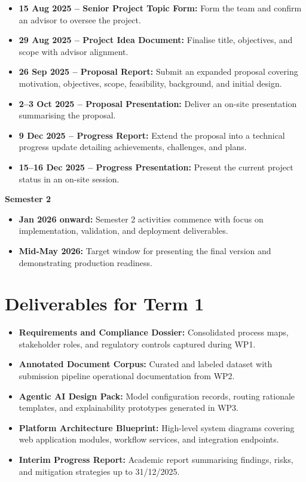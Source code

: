 \documentclass[12pt,oneside,openright,a4paper]{cpe-english-project}
\begin{document}
\begin{itemize}
\item \textbf{15 Aug 2025 -- Senior Project Topic Form:} Form the team and confirm an advisor to oversee the project.
\item \textbf{29 Aug 2025 -- Project Idea Document:} Finalise title, objectives, and scope with advisor alignment.
\item \textbf{26 Sep 2025 -- Proposal Report:} Submit an expanded proposal covering motivation, objectives, scope, feasibility, background, and initial design.
\item \textbf{2--3 Oct 2025 -- Proposal Presentation:} Deliver an on-site presentation summarising the proposal.
\item \textbf{9 Dec 2025 -- Progress Report:} Extend the proposal into a technical progress update detailing achievements, challenges, and plans.
\item \textbf{15--16 Dec 2025 -- Progress Presentation:} Present the current project status in an on-site session.
\end{itemize}

\textbf{Semester 2}

\begin{itemize}
\item \textbf{Jan 2026 onward:} Semester 2 activities commence with focus on implementation, validation, and deployment deliverables.
\item \textbf{Mid-May 2026:} Target window for presenting the final version and demonstrating production readiness.
\end{itemize}

\section{Deliverables for Term 1}

\begin{itemize}
\item\textbf{ Requirements and Compliance Dossier:} Consolidated process maps, stakeholder roles, and regulatory controls captured during WP1.
\item\textbf{ Annotated Document Corpus:} Curated and labeled dataset with submission pipeline operational documentation from WP2.
\item\textbf{ Agentic AI Design Pack:} Model configuration records, routing rationale templates, and explainability prototypes generated in WP3.
\item\textbf{ Platform Architecture Blueprint:} High-level system diagrams covering web application modules, workflow services, and integration endpoints.
\item\textbf{ Interim Progress Report:} Academic report summarising findings, risks, and mitigation strategies up to 31/12/2025.
\end{itemize}
\end{document}
